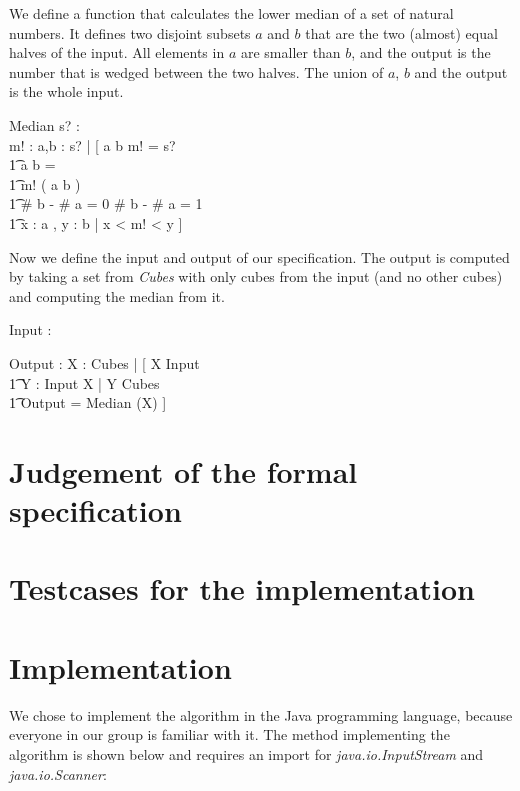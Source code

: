 \documentclass[12pt]{article}
\begin{document}
We define a function that calculates the lower median of a set of natural numbers. It defines two disjoint subsets $a$ and $b$ that are the two (almost) equal halves of the input. All elements in $a$ are smaller than $b$, and the output is the number that is wedged between the two halves. The union of $a$, $b$ and the output is the whole input.
\begin{schema}{Median}
s? : \power \nat \\
m! : \nat
\where
\exists a,b : \power s? | [ \: a \union b \union m! = s? \\
                          \t1 a \cap b = \emptyset \\
                          \t1 m! \notin ( a \union b ) \\
                          \t1 \# b - \# a = 0 \: \vee \# b - \# a = 1 \\
                          \t1 \forall x : a , y : b | x < m! < y \: ]
\end{schema}

Now we define the input and output of our specification. The output is computed by taking a set from \textsl{Cubes} with only cubes from the input (and no other cubes) and computing the median from it.
\begin{axdef}
Input : \seq \nat
\end{axdef}

\begin{axdef}
Output : \nat
\where
\exists X : Cubes | [ \: X \subseteq \ran Input \\ \t1 \forall Y : \ran Input \setminus X | Y \not\subseteq Cubes \\ \t1 Output = Median (X) \: ]
\end{axdef}

\section{Judgement of the formal specification}

\section{Testcases for the implementation}

\section{Implementation}
We chose to implement the algorithm in the Java programming language, because everyone in our group is familiar with it. The method implementing the algorithm is shown below and requires an import for \textsl{java.io.InputStream} and \textsl{java.io.Scanner}:
\end{document}
